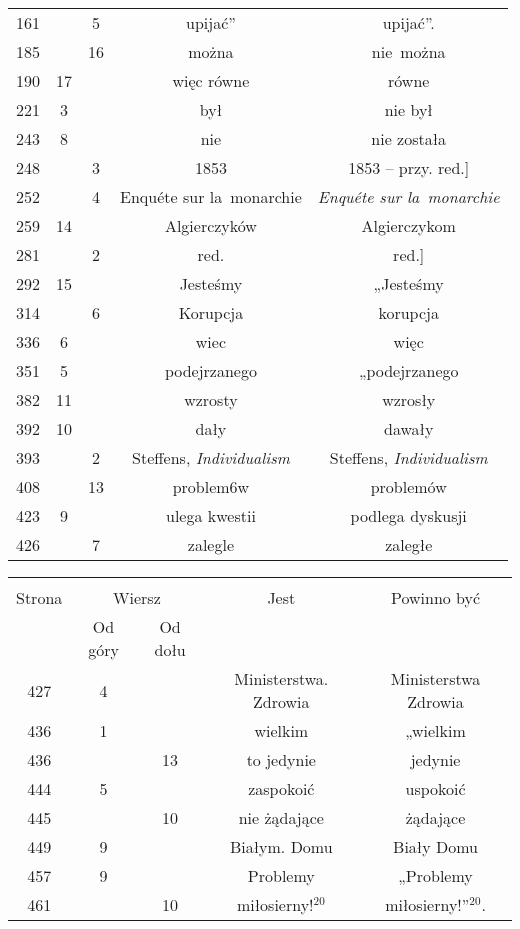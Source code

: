 \documentclass[a4paper,11pt]{article}
\begin{document}
\begin{center}
\begin{tabular}{|c|c|c|c|c|}
    161 & &  5 & upijać” & upijać”. \\
    185 & & 16 & można & nie~można \\
    190 & 17 & & więc równe & równe \\
    221 &  3 & & był & nie był \\
    243 &  8 & & nie & nie została \\
    248 & &  3 & 1853 & 1853 -- przy. red.] \\
    252 & &  4 & Enqu\'{e}te sur la~monarchie
           & \textit{Enqu\'{e}te sur la~monarchie} \\
    259 & 14 & & Algierczyków & Algierczykom \\
    281 & &  2 & red. & red.] \\
    292 & 15 & & Jesteśmy & „Jesteśmy \\
    314 & &  6 & Korupcja & korupcja \\
    336 &  6 & & wiec & więc \\
    351 &  5 & & podejrzanego & „podejrzanego \\
    382 & 11 & & wzrosty & wzrosły \\
    392 & 10 & & dały & dawały \\
    393 & &  2 & Steffens,{ }{ }\textit{Individualism}
           & Steffens, \textit{Individualism} \\
    408 & & 13 & problem6w & problemów \\
    423 &  9 & & ulega kwestii & podlega dyskusji \\
    426 & &  7 & zalegle & zaległe \\
    \hline
  \end{tabular}





  \begin{tabular}{|c|c|c|c|c|}
    \hline
    & \multicolumn{2}{c|}{} & & \\
    Strona & \multicolumn{2}{c|}{Wiersz} & Jest
                              & Powinno być \\ \cline{2-3}
    & Od góry & Od dołu & & \\
    \hline
    427 &  4 & & Ministerstwa. Zdrowia & Ministerstwa Zdrowia \\
    436 &  1 & & wielkim & „wielkim \\
    436 & & 13 & to jedynie & jedynie \\
    444 &  5 & & zaspokoić & uspokoić \\
    445 & & 10 & nie żądające & żądające \\
    449 &  9 & & Białym. Domu & Biały Domu \\
    457 &  9 & & Problemy & „Problemy \\
    461 & & 10 & miłosierny!$^{ 20 }$ & miłosierny!”$^{ 20 }$. \\
    \hline
  \end{tabular}






\end{center}
\end{document}
